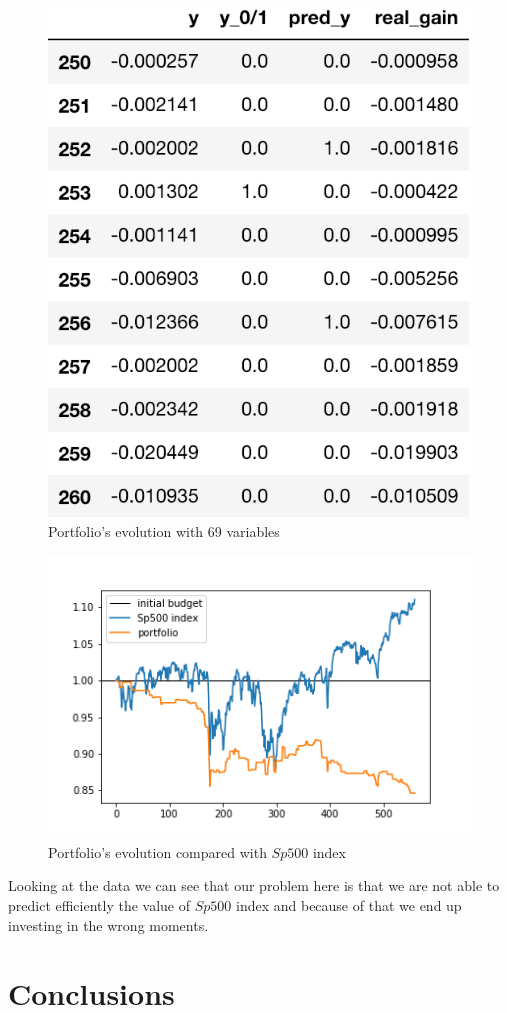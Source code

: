 \documentclass{article}%
\begin{document}
  \begin{figure}[h!]
  \centering
  \includegraphics[scale=0.55]{act_port_log.png}
  \caption{Portfolio's evolution with 69 variables}
  \label{portfolio_table_logit}
  \end{figure}
  
      \begin{figure}[h!]
  \centering
  \includegraphics[scale=0.6]{act_portfolio_logit.png}
  \caption{Portfolio's evolution compared with $Sp500$ index}
  \label{portfolio_graph_logit}
  \end{figure}

Looking at the data we can see that our problem here is that we are not able to predict efficiently the value of $Sp500$ index and because of that we end up investing in the wrong moments.

\section{Conclusions}
\end{document}
